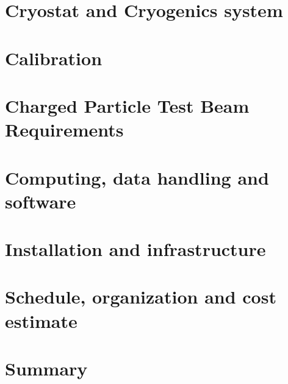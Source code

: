 \documentclass[12pt]{article}
\begin{document}
\section{Cryostat and Cryogenics system} %
	
	
\section{Calibration}
	

\section{Charged Particle Test Beam Requirements} %
	


\section{Computing, data handling and software} %
	

\section{Installation and infrastructure}  %
	
	
	
\section{Schedule, organization and cost estimate} %
	

\section{Summary}  %
	



\end{document}
